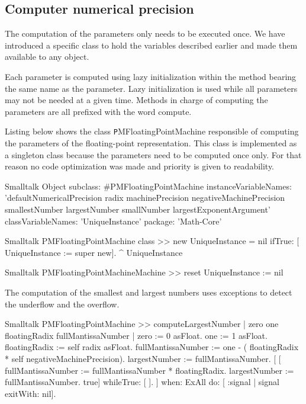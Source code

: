 \subsection{Computer numerical precision}
The computation of the parameters only needs to be executed once.
We have introduced a specific class to hold the variables
described earlier and made them available to any object.

Each parameter is computed using lazy initialization within the
method bearing the same name as the parameter. Lazy initialization
is used while all parameters may not be needed at a given time.
Methods in charge of computing the parameters are all prefixed
with the word compute.

Listing below shows the class {\texttt
PMFloatingPointMachine} responsible of computing the parameters
of the floating-point representation. This class is implemented as
a singleton class because the parameters need to be computed once
only. For that reason no code optimization was made and priority
is given to readability.

\begin{displaycode}{Smalltalk}
Object subclass: #PMFloatingPointMachine
  instanceVariableNames: 'defaultNumericalPrecision radix machinePrecision negativeMachinePrecision smallestNumber largestNumber smallNumber largestExponentArgument'
  classVariableNames: 'UniqueInstance'
  package: 'Math-Core'
\end{displaycode}

\begin{displaycode}{Smalltalk}
PMFloatingPointMachine class >> new
   UniqueInstance = nil
        ifTrue: [ UniqueInstance := super new].
   ^ UniqueInstance
\end{displaycode}

\begin{displaycode}{Smalltalk}
PMFloatingPointMachineMachine >> reset
   UniqueInstance := nil
\end{displaycode}

\noindent The computation of the smallest and largest numbers uses
exceptions to detect the underflow and the overflow.

\begin{displaycode}{Smalltalk}
PMFloatingPointMachine >> computeLargestNumber
    | zero one floatingRadix fullMantissaNumber |
    zero := 0 asFloat.
    one := 1 asFloat.
    floatingRadix := self radix asFloat.
    fullMantissaNumber := one - ( floatingRadix * self negativeMachinePrecision).
    largestNumber := fullMantissaNumber.
    [ [ fullMantissaNumber := fullMantissaNumber * floatingRadix.
        largestNumber := fullMantissaNumber.
        true] whileTrue: [ ].
        ] when: ExAll do: [ :signal | signal exitWith: nil].
\end{displaycode}

